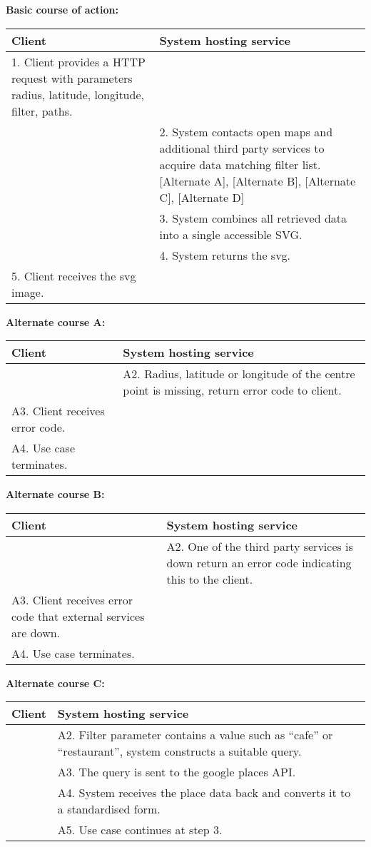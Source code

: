 \documentclass[11pt,twoside,a4paper]{article}
\begin{document}
\noindent
\textbf{Basic course of action:}\\
\begin{tabularx}{\textwidth}{ |X|X| }
  \textbf{Client} & \textbf{System hosting service}\\
  \hline
  1. Client provides a HTTP request with parameters radius, latitude, longitude,
  filter, paths. & \\
  \hline
  & 2. System contacts open maps and additional third party services to acquire data matching
  filter list. [Alternate A], [Alternate B], [Alternate C], [Alternate D]\\
  \hline
  & 3. System combines all retrieved data into a single accessible
  SVG.\\
  \hline
  & 4. System returns the svg.\\
  \hline
  5. Client receives the svg image. & \\
  \hline
\end{tabularx}

\noindent
\textbf{Alternate course A:}\\
\begin{tabularx}{\textwidth}{ |X|X| }
  \textbf{Client} & \textbf{System hosting service}\\
  \hline
  & A2. Radius, latitude or longitude of the centre point is missing, return
  error code to client.\\
  \hline
  A3. Client receives error code. & \\
  \hline
  A4. Use case terminates. & \\
  \hline
\end{tabularx}

\noindent
\textbf{Alternate course B:}\\
\begin{tabularx}{\textwidth}{ |X|X| }
  \textbf{Client} & \textbf{System hosting service}\\
  \hline
  & A2. One of the third party services is down return an error code
  indicating this to the client.\\
  \hline
  A3. Client receives error code that external services are down. & \\
  \hline
  A4. Use case terminates. & \\
  \hline
\end{tabularx}

\noindent
\textbf{Alternate course C:}\\
\begin{tabularx}{\textwidth}{ |X|X| }
  \textbf{Client} & \textbf{System hosting service}\\
  \hline
  & A2. Filter parameter contains a value such as ``cafe'' or
  ``restaurant'', system constructs a suitable query.\\
  \hline
  & A3. The query is sent to the google places API.\\
  \hline
  & A4. System receives the place data back and converts it to a
  standardised form.\\
  \hline
  & A5. Use case continues at step 3.\\
  \hline
\end{tabularx}
\end{document}
